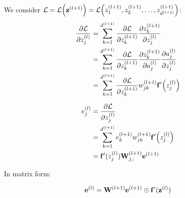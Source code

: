 \documentclass[14pt, a4paper]{article}
\numberwithin{equation}{section}
\numberwithin{algorithm}{section}
\numberwithin{figure}{section}
\begin{document}
We consider $\mathcal{L} = \mathcal{L}\Big(\bold{z}^{(l+1)}\Big)=\mathcal{L}\Big(z_1^{(l+1)}, z_2^{(l+1)}, \dots, z_{d^{(l+1)}}^{(l+1)}\Big)$:
\begin{equation}
	\begin{aligned}
		\dfrac{\partial \mathcal{L}}{\partial z_j^{(l)}}&=\sum_{k=1}^{d^{(l+1)}}\dfrac{\partial \mathcal{L}}{\partial z_k^{(l+1)}} \dfrac{\partial z_k^{(l+1)}}{\partial z_j^{(l)}}\\&=\sum_{k=1}^{d^{(l+1)}} \dfrac{\partial \mathcal{L}}{\partial z_k^{(l+1)}} \dfrac{\partial z_k^{(l+1)}}{\partial a_j^{(l)}} \dfrac{\partial a_j^{(l)}}{\partial z_j^{(l)}}\\&=\sum_{k=1}^{d^{(l+1)}}\dfrac{\partial \mathcal{L}}{\partial z_k^{(l+1)}}w_{jk}^{(l+1)}\bold{f}^{\prime}\Big(z_j^{(l)}\Big)
	\end{aligned}
\end{equation}

\begin{equation}
	\begin{aligned}
		e_j^{(l)}&=\dfrac{\partial \mathcal{L}}{\partial z_j^{(l)}}\\&=\sum_{k=1}^{d^{(l+1)}}e_k^{(l+1)}w_{jk}^{(l+1)}\bold{f}^{\prime}\Big(z_j^{(l)}\Big)\\&=\bold{f}^{\prime}(z_j^{(l)})\bold{W}_{j,:}^{(l+1)}\bold{e}^{(l+1)}
	\end{aligned}
\end{equation}

In matrix form:

\begin{equation}
  \bold{e}^{(l)}=\bold{W}^{(l+1)}\bold{e}^{(l+1)}\odot\bold{f}^{\prime}(\bold{z}^{(l)})
\end{equation}
\end{document}
